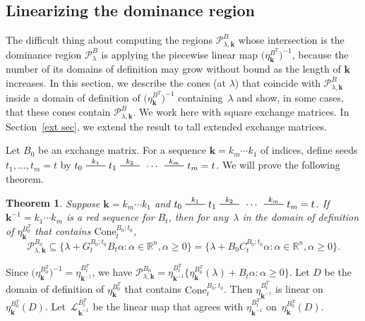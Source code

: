 \documentclass{amsart}
\newtheorem{theorem}[proposition]{Theorem}
\theoremstyle{definition}
\theoremstyle{remark}
\numberwithin{equation}{section}
\newcommand{\reals}{\mathbb R}
\newcommand{\edge}{\,\,\rule[2.7pt]{20pt}{0.5pt}\,\,}
\newcommand{\set}[1]{{\lbrace #1 \rbrace}}
\newcommand{\sett}[1]{{\bigl\lbrace #1 \bigr\rbrace}}
\newcommand{\0}{{\mathbf{0}}}
\newcommand{\Cone}{\mathrm{Cone}}
\newcommand{\g}{\mathbf{g}}
\newcommand{\kk}{{\boldsymbol{k}}}
\renewcommand{\L}{\mathcal{L}}
\renewcommand{\P}{\mathcal{P}}
\begin{document}
\subsection{Linearizing the dominance region}\label{lin sec}
The difficult thing about computing the regions $\P^B_{\lambda,\kk}$ whose intersection is the dominance region $\P^B_\lambda$ is applying the piecewise linear map $\bigl(\eta^{B^T}_\kk\bigr)^{-1}$, because the number of its domains of definition may grow without bound as the length of $\kk$ increases.
In this section, we describe the cones (at $\lambda$) that coincide with $\P^B_{\lambda,\kk}$ inside a domain of definition of $\bigl(\eta^{B^T}_\kk\bigr)^{-1}$ containing~$\lambda$ and show, in some cases, that these cones contain $\P^B_{\lambda,\kk}$.
We work here with square exchange matrices.
In Section~\ref{ext sec}, we extend the result to tall extended exchange matrices.

Let $B_0$ be an exchange matrix.
For a sequence $\kk=k_m\cdots k_1$ of indices, define seeds $t_1,\ldots,t_m=t$ by $t_0\overset{k_1}{\edge}t_1\overset{k_2}{\edge}\,\cdots\,\overset{k_m}{\edge}t_m=t$.
We will prove the following theorem.

\begin{theorem}\label{P in B0C}
Suppose $\kk=k_m\cdots k_1$ and $t_0\overset{k_1}{\edge}t_1\overset{k_2}{\edge}\,\cdots\,\overset{k_m}{\edge}t_m=t$.
If $\kk^{-1}=k_1\cdots k_m$ is a red sequence for $B_t$, then for any~$\lambda$ in the domain of definition of $\eta_\kk^{B_0^T}$ that contains $\Cone^{B_0;t_0}_t$,
\[\P^{B_0}_{\lambda,\kk}\subseteq\set{\lambda+G_t^{B_0;t_0}B_t\alpha:\alpha\in\reals^n,\alpha\ge0}=\set{\lambda+B_0C_t^{B_0;t_0}\alpha:\alpha\in\reals^n,\alpha\ge0}.\]
\end{theorem}

Since $\bigl(\eta_{\kk}^{B_0^T}\bigr)^{-1}=\eta_{\kk^{-1}}^{B_t^T}$, we have $\P^{B_0}_{\lambda,\kk}=\eta_{\kk^{-1}}^{B_t^T}\sett{\eta_\kk^{B_0^T}(\lambda)+B_t\alpha:\alpha\ge0}$.
Let $D$ be the domain of definition of $\eta_{\kk}^{B_0^T}$  that contains $\Cone^{B_0;t_0}_t$.
Then $\eta_{\kk^{-1}}^{B_t^T}$ is linear on $\eta_{\kk}^{B_0^T}(D)$.
Let~$\L_{\kk^{-1}}^{B_t^T}$ be the linear map that agrees with $\eta_{\kk^{-1}}^{B_t^T}$ on~$\eta_{\kk}^{B_0^T}(D)$.
\end{document}
